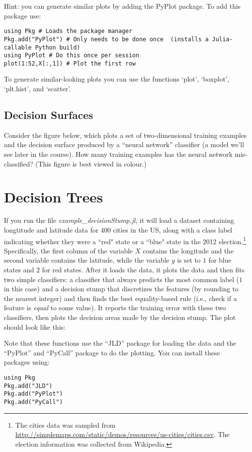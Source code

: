 \documentclass{article}
\def\blu#1{{\color{blu}#1}}
\begin{document}
Hint: you can generate similar plots by adding the PyPlot package. To add this package use:
\begin{verbatim}
using Pkg # Loads the package manager
Pkg.add("PyPlot") # Only needs to be done once  (installs a Julia-callable Python build)
using PyPlot # Do this once per session
plot(1:52,X[:,1]) # Plot the first row
\end{verbatim}
To generate similar-looking plots you can use the functions `plot', `boxplot', `plt.hist', and `scatter'.


\subsection{Decision Surfaces}

Consider the figure below, which plots a set of two-dimensional training examples and the decision surface produced by a ``neural network'' classifier (a model we'll see later in the course).
\blu{How many training examples has the neural network mis-classified?} (This figure is best viewed in colour.)


\section{Decision Trees}

If you run the file \emph{example\_decisionStump.jl}, it will load a dataset containing longtitude and latitude data for 400 cities in the US, along with a class label indicating whether they were a ``red" state or a ``blue" state in the 2012 election.\footnote{The cities data was sampled from \url{http://simplemaps.com/static/demos/resources/us-cities/cities.csv}. The election information was collected from Wikipedia.} Specifically, the first column of the variable $X$ contains the longitude and the second variable contains the latitude, while the variable $y$ is set to $1$ for blue states and $2$ for red states. After it loads the data, it plots the data and then fits two simple classifiers: a classifier that always predicts the most common label ($1$ in this case) and a decision stump that discretizes the features (by rounding to the nearest integer) and then finds the best equality-based rule (i.e., check if a feature is \emph{equal} to some value). It reports the training error with these two classifiers, then plots the decision areas made by the decision stump. The plot should look like this:

Note that these functions use the ``JLD'' package for loading the data and the ``PyPlot'' and ``PyCall'' package to do the plotting. You can install these packages using:
\begin{verbatim}
using Pkg
Pkg.add("JLD")
Pkg.add("PyPlot")
Pkg.add("PyCall")
\end{verbatim}
\end{document}

